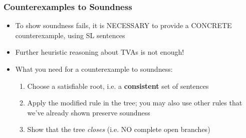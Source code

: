 \iffalse %
\begin{frame}
\frametitle{Why `top down' reasoning works for Soundness}

\begin{itemize}[<+->]

\item Given an open branch, we ask whether applying the rule preserves the existence of an open branch

\item Semantically: given a satisfiable set of sentences, we ask whether the rule preserves the existence of a satisfiable set

\item Sound rules take us from trees with open branches to trees with open branches

\end{itemize}
\end{frame}

\fi 



\begin{frame}
\frametitle{Counterexamples to Soundness}

\begin{itemize}[<+->]

\item To show soundness fails, it is NECESSARY to provide a CONCRETE counterexample, using SL sentences

\bi

\item Further heuristic reasoning about TVAs is not enough!

\ei

\bigskip

\item What you need for a counterexample to soundness:

\begin{enumerate}[1.)]

\item Choose a satisfiable root, i.e. a \textbf{\textcolor{OGlyallpink}{consistent}} set of sentences

\item Apply the modified rule in the tree; you may also use other rules that we've already shown preserve soundness

\item Show that the tree \emph{closes} (i.e. NO \textcolor{OGlyallpink}{complete open branches})

\end{enumerate}

\end{itemize}
\end{frame}



